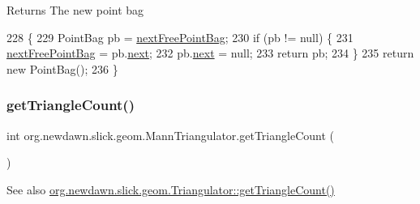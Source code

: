 \begin{DoxyReturn}{Returns}
The new point bag 
\end{DoxyReturn}

\begin{DoxyCode}
228                                    \{
229         PointBag pb = \mbox{\hyperlink{classorg_1_1newdawn_1_1slick_1_1geom_1_1_mann_triangulator_a4ffb313293a8dcbbed43a28005e225bb}{nextFreePointBag}};
230         \textcolor{keywordflow}{if} (pb != null) \{
231             \mbox{\hyperlink{classorg_1_1newdawn_1_1slick_1_1geom_1_1_mann_triangulator_a4ffb313293a8dcbbed43a28005e225bb}{nextFreePointBag}} = pb.\mbox{\hyperlink{classorg_1_1newdawn_1_1slick_1_1geom_1_1_mann_triangulator_1_1_point_bag_aa38075c8f56143bcdd9f754bfea38018}{next}};
232             pb.\mbox{\hyperlink{classorg_1_1newdawn_1_1slick_1_1geom_1_1_mann_triangulator_1_1_point_bag_aa38075c8f56143bcdd9f754bfea38018}{next}} = null;
233             \textcolor{keywordflow}{return} pb;
234         \}
235         \textcolor{keywordflow}{return} \textcolor{keyword}{new} PointBag();
236     \}
\end{DoxyCode}
\mbox{\label{classorg_1_1newdawn_1_1slick_1_1geom_1_1_mann_triangulator_a3d982150cac3d36cd7c22e146e6c48b3}} 
\subsubsection{\texorpdfstring{get\+Triangle\+Count()}{getTriangleCount()}}
{\footnotesize\ttfamily int org.\+newdawn.\+slick.\+geom.\+Mann\+Triangulator.\+get\+Triangle\+Count (\begin{DoxyParamCaption}{ }\end{DoxyParamCaption})\hspace{0.3cm}{\ttfamily [inline]}}

\begin{DoxySeeAlso}{See also}
\mbox{\hyperlink{interfaceorg_1_1newdawn_1_1slick_1_1geom_1_1_triangulator_a7a5d68a694f2b80878c48563b5ea6f1f}{org.\+newdawn.\+slick.\+geom.\+Triangulator\+::get\+Triangle\+Count()}} 
\end{DoxySeeAlso}


